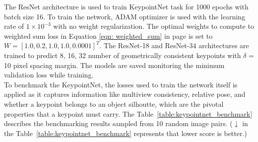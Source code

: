 The \ac{ResNet} architecture is used to train KeypointNet task for 1000 epochs with batch size 16.
To train the network, ADAM optimizer is used with the learning rate of $1 \times 10^{-3}$ with no weight regularization. The optimal weights to compute
to weighted sum loss in Equation \ref{eqn: weighted_sum} in page \pageref{eqn: weighted_sum} is set to $W=[1.0, 0.2, 1.0, 1.0, 0.0001]^T$. The \ac{ResNet}-18 and \ac{ResNet}-34 architectures are
trained to predict 8, 16, 32 number of geometrically consistent keypoints with $\delta$ = 10 pixel spacing margin. The models are saved monitoring the minimum validation loss while training.\\

To benchmark the KeypointNet, the losses used to train the network itself is applied as it captures information like multiview consistency, relative pose, and whether a keypoint belongs to an object silhoutte, which are the pivotal properties that a keypoint must carry. The Table~\ref{table:keypointnet_benchmark} describes the benchmarking results sampled from 10 random image pairs.
($\downarrow$ in the Table~\ref{table:keypointnet_benchmark} represents that lower score is better.) \\


